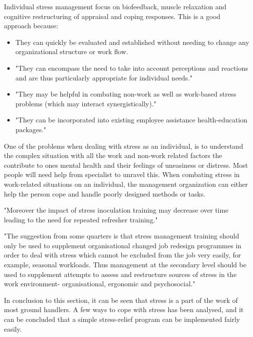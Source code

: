 Individual stress management focus on biofeedback, muscle relaxation and cognitive restructuring of appraisal and coping responses. This is a good approach because:

\begin{itemize}
\item They can quickly be evaluated and established without needing to change any organizational structure or work flow.
\item "They can encompass the need to take into account perceptions and reactions and are thus particularly appropriate for individual needs."
\item "They may be helpful in combating non-work as well as work-based stress problems (which may interact synergistically)."
\item "They can be incorporated into existing employee assistance health-education packages."
\end{itemize}

One of the problems when dealing with stress as an individual, is to understand the complex situation with all the work and non-work related factors the contribute to ones mental health and their feelings of uneasiness or distress. Most people will need help from specialist to unravel this.
When combating stress in work-related situations on an individual, the management organization can either help the person cope and handle poorly designed methods or tasks.

"Moreover the impact of stress inoculation training may decrease over time leading to the need for repeated refresher training."

"The suggestion from some quarters is that stress management training should only be used to supplement organisational changed job redesign programmes in order to deal with stress which cannot be excluded from the job very easily, for example, seasonal workloads. Thus management at the secondary level should be used to supplement attempts to assess and restructure sources of stress in the work environment- organisational, ergonomic and psychosocial."

In conclusion to this section, it can be seen that stress is a part of the work of most ground handlers. A few ways to cope with stress has been analysed, and it can be concluded that a simple stress-relief program can be implemented fairly easily.